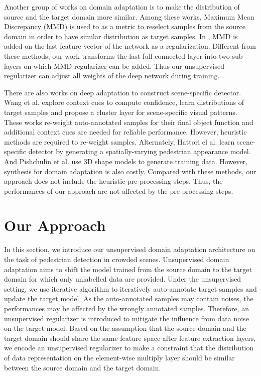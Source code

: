 \documentclass[runningheads]{llncs}
\begin{document}
Another group of works \cite{huang2006correcting,gretton2009covariate,gong2013connecting,ghifary2014domain} on domain adaptation is to make the distribution of source and the target domain more similar. Among these works, Maximum Mean Discrepancy (MMD) is used to as a metric to reselect samples from the source domain in order to have similar distribution as target samples. In \cite{tzeng2014deep}, MMD is added on the last feature vector of the network as a regularization. Different from these methods, our work transforms the last full connected layer into two sub-layers on which MMD regularizer can be added. Thus our unsupervised regularizer can adjust all weights of the deep network during training.

There are also works on deep adaptation to construct scene-specific detector. Wang et al.\cite{wang2014scene} explore context cues to compute confidence, \cite{zeng2014deep} learn distributions of target samples and propose a cluster layer for scene-specific visual patterns. These works re-weight auto-annotated samples for their final object function and additional context cues are needed for reliable performance. However, heuristic methods are required to re-weight samples. Alternately, Hattori el al. \cite{hattori2015learning} learn scene-specific detector by generating a spatially-varying pedestrian appearance model. And Pishchulin et al. \cite{pishchulin2011learning} use 3D shape models to generate training data. However, synthesis for domain adaptation is also costly. Compared with these methods, our approach does not include the heuristic pre-processing steps. Thus, the performances of our approach are not affected by the  pre-processing steps.


\section{Our Approach}
\label{section:Our Approach}

In this section, we introduce our unsupervised domain adaptation architecture on the task of pedestrian detection in crowded scenes. Unsupervised
domain adaptation aims to shift the model trained from the source domain to the target domain for which only unlabelled data are provided. Under the unsupervised setting, we use iterative algorithm to iteratively auto-annotate target samples and update the target model. As the auto-annotated samples may contain noises, the performances may be affected by the wrongly annotated samples. Therefore, an unsupervised regularizer is introduced to mitigate the influence from data noise on the target model. Based on the assumption that the source domain and the target domain should share the same feature space after feature extraction layers, we encode an unsupervised regularizer to make a constraint that the distribution of data representation on the element-wise multiply layer should be similar between the source domain and the target domain.
\end{document}
